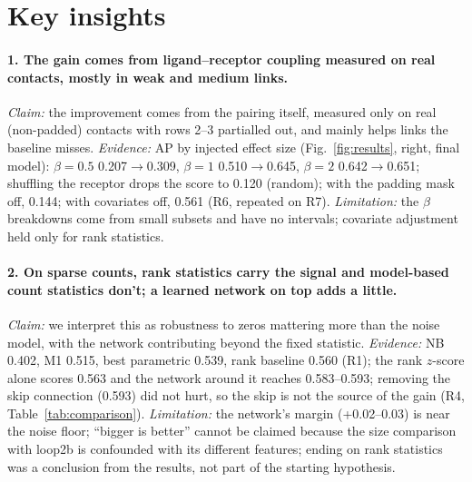 \documentclass{article}
\begin{document}
\section{Key insights}
\paragraph{1. The gain comes from ligand--receptor coupling measured on real contacts, mostly in weak and medium links.}
\emph{Claim:} the improvement comes from the pairing itself, measured only on real (non-padded) contacts with rows
2--3 partialled out, and mainly helps links the baseline misses. \emph{Evidence:} AP by injected effect size
(Fig.~\ref{fig:results}, right, final model): $\beta{=}0.5$ 0.207$\to$0.309, $\beta{=}1$ 0.510$\to$0.645,
$\beta{=}2$ 0.642$\to$0.651; shuffling the receptor drops the score to 0.120 (random); with the padding mask off,
0.144; with covariates off, 0.561 (R6, repeated on R7). \emph{Limitation:} the $\beta$ breakdowns come from small subsets and have no
intervals; covariate adjustment held only for rank statistics.

\paragraph{2. On sparse counts, rank statistics carry the signal and model-based count statistics don't; a learned
network on top adds a little.} \emph{Claim:} we interpret this as robustness to zeros mattering more than the noise
model, with the network contributing beyond the fixed statistic. \emph{Evidence:} NB 0.402, M1 0.515, best
parametric 0.539, rank baseline 0.560 (R1); the rank $z$-score alone scores 0.563 and the network around it reaches
0.583--0.593; removing the skip connection (0.593) did not hurt, so the skip is not the source of the gain (R4,
Table~\ref{tab:comparison}). \emph{Limitation:} the network's margin (+0.02--0.03) is near the noise floor;
``bigger is better'' cannot be claimed because the size comparison with loop2b is confounded with its different
features; ending on rank statistics was a conclusion from the results, not part of the starting hypothesis.
\end{document}
